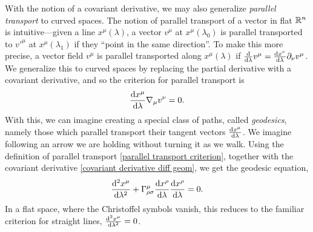 %
With the notion of a covariant derivative, we may also generalize \emph{parallel transport} to curved spaces.
The notion of parallel transport of a vector in flat $\mathbb{R}^n$ is intuitive---given a line $x^\mu(\lambda)$, a vector $v^\mu$ at $x^\mu(\lambda_0)$ is parallel transported to $v'^\mu$ at $x^\mu(\lambda_1)$ if they ``point in the same direction''.
To make this more precise, a vector field $v^\mu$ is parallel transported along $x^\mu(\lambda)$ if $\odv{}{\lambda} v^\mu = \odv{x^\nu}{\lambda} \partial_\nu v^\mu$.
We generalize this to curved spaces by replacing the partial derivative with a covariant derivative, and so the criterion for parallel transport is
%
\begin{equation}
    \label{parallel transport criterion}
    \odv{x^\mu}{\lambda} \nabla_\mu v^\nu = 0.
\end{equation}
%
With this, we can imagine creating a special class of paths, called \emph{geodesics}, namely those which parallel transport their tangent vectors $\odv{x^\mu}{\lambda}$.
We imagine following an arrow we are holding without turning it as we walk.
Using the definition of parallel transport \autoref{parallel transport criterion}, together with the covariant derivative \autoref{covariant derivative diff geom}, we get the geodesic equation,
%
\begin{equation}
    \label{goedesic equation}
    \odv[2]{x^\mu}{\lambda} 
    + \Gamma^\mu_{\rho \sigma} \odv{x^\rho}{\lambda} \odv{x^\rho}{\lambda}
    = 0.
\end{equation}
In a flat space, where the Christoffel symbols vanish, this reduces to the familiar criterion for straight lines, $\odv[2]{x^\mu}{\lambda} = 0$.

